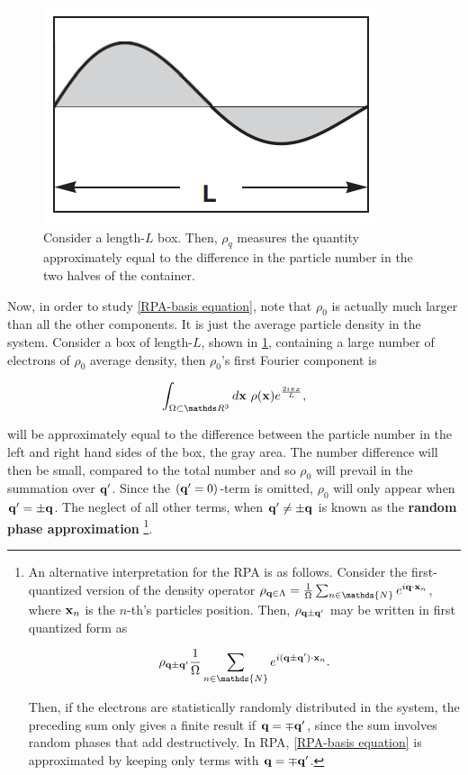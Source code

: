 \begin{figure}
    \centering
    \includegraphics[scale = .5]{figs/Jellium model/RPA-fig.png} 
    \caption{Consider a length-$L$ box. Then, $\rho_q$ measures the quantity approximately equal to the difference in the particle number in the two halves of the container. }
    \label{fig:RPA-box}
\end{figure}

Now, in order to study \cref{RPA-basis equation}, note that $\rho_0$ is actually much larger than all the other components. It is just the average particle density in the system. Consider a box of length-$L$, shown in \cref{fig:RPA-box}, containing a large number of electrons of $\rho_0$ average density, then $\rho_0$'s first Fourier component is 

$$
    \int_{\Omega \subset \R^3} d{\bf x} \blanky \rho({\bf x}) e^{\frac{2i \pi x}{L}},
$$

will be approximately equal to the difference between the particle number in the left and right hand sides of the box, the gray area. The number difference will then be small, compared to the total number and so $\rho_0$ will prevail in the summation over ${\bf q}'$. Since the $({\bf q}' = 0)$-term is omitted, $\rho_0$ will only appear when ${\bf q}' = \pm {\bf q}$. The neglect of all other terms, when ${\bf q}' \neq \pm {\bf q}$ is known as the \textbf{random phase approximation} \footnote{An alternative interpretation for the RPA is as follows. Consider the first-quantized version of the density operator $\rho_{{\bf q} \in \Lambda} = \frac{1}{\Omega} \sum_{n \in \mathds{N}} e^{i {\bf q} \cdot {\bf x}_n}$, where ${\bf x}_n$ is the $n$-th's particles position. Then, $\rho_{{\bf q} \pm {\bf q}'}$ may be written in first quantized form as 

$$
    \rho_{{\bf q} \pm {\bf q}'} \frac{1}{\Omega} \sum_{n \in \mathds{N}} e^{i ({\bf q} \pm {\bf q}') \cdot {\bf x}_n}.
$$

Then, if the electrons are statistically randomly distributed in the system, the preceding sum only gives a finite result if ${\bf q} = \mp {\bf q'}$, since the sum involves random phases that add destructively. In RPA, \cref{RPA-basis equation} is approximated by keeping only terms with ${\bf q} = \mp {\bf q}'$. }.\\

